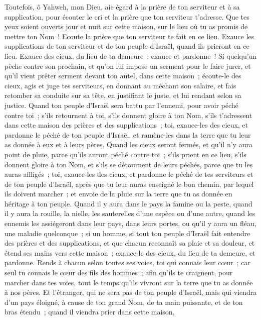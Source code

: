 \begin{multicols}{2}
Toutefois, ô Yahweh, mon Dieu, aie égard à la prière de ton serviteur et à sa supplication, pour écouter le cri et la prière que ton serviteur t'adresse.
Que tes yeux soient ouverts jour et nuit sur cette maison, sur le lieu où tu as promis de mettre ton Nom~! Ecoute la prière que ton serviteur te fait en ce lieu.
Exauce les supplications de ton serviteur et de ton peuple d'Israël, quand ils prieront en ce lieu. Exauce des cieux, du lieu de ta demeure~; exauce et pardonne~!
Si quelqu'un pèche contre son prochain, et qu'on lui impose un serment pour le faire jurer, et qu'il vient prêter serment devant ton autel, dans cette maison~;
écoute-le des cieux, agis et juge tes serviteurs, en donnant au méchant son salaire, et fais retomber sa conduite sur sa tête, en justifiant le juste, et lui rendant selon sa justice.
Quand ton peuple d'Israël sera battu par l'ennemi, pour avoir péché contre toi~; s'ils retournent à toi, s'ils donnent gloire à ton Nom, s'ils t'adressent dans cette maison des prières et des supplications~;
toi, exauce-les des cieux, et pardonne le péché de ton peuple d'Israël, et ramène-les dans la terre que tu leur as donnée à eux et à leurs pères.
Quand les cieux seront fermés, et qu'il n'y aura point de pluie, parce qu'ils auront péché contre toi~; s'ils prient en ce lieu, s'ils donnent gloire à ton Nom, et s'ils se détournent de leurs péchés, parce que tu les auras affligés~;
toi, exauce-les des cieux, et pardonne le péché de tes serviteurs et de ton peuple d'Israël, après que tu leur auras enseigné le bon chemin, par lequel ils doivent marcher~; et envoie de la pluie sur la terre que tu as donnée en héritage à ton peuple.
Quand il y aura dans le pays la famine ou la peste, quand il y aura la rouille, la nielle, les sauterelles d'une espèce ou d'une autre, quand les ennemis les assiégeront dans leur pays, dans leurs portes, ou qu'il y aura un fléau, une maladie quelconque~;
si un homme, si tout ton peuple d'Israël fait entendre des prières et des supplications, et que chacun reconnaît sa plaie et sa douleur, et étend ses mains vers cette maison~;
exauce-le des cieux, du lieu de ta demeure, et pardonne. Rends à chacun selon toutes ses voies, toi qui connais leur cœur~; car seul tu connais le cœur des fils des hommes~;
afin qu'ils te craignent, pour marcher dans tes voies, tout le temps qu'ils vivront sur la terre que tu as donnée à nos pères.
Et l'étranger, qui ne sera pas de ton peuple d'Israël, mais qui viendra d'un pays éloigné, à cause de ton grand Nom, de ta main puissante, et de ton bras étendu~; quand il viendra prier dans cette maison,

\end{multicols}
